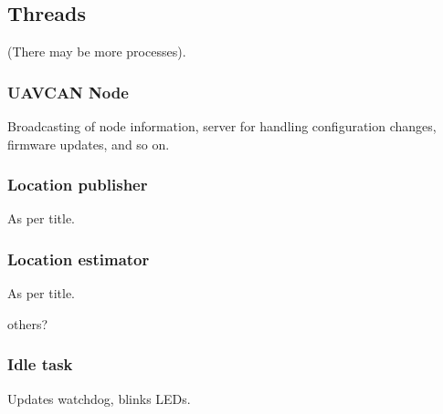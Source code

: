 \subsection{Threads}
(There may be more processes).


\subsubsection{UAVCAN Node}
Broadcasting of node information, server for handling configuration changes, firmware updates, and so on.

\subsubsection{Location publisher}
As per title.

\subsubsection{Location estimator}
As per title.

others?

\subsubsection{Idle task}
Updates watchdog, blinks LEDs.
